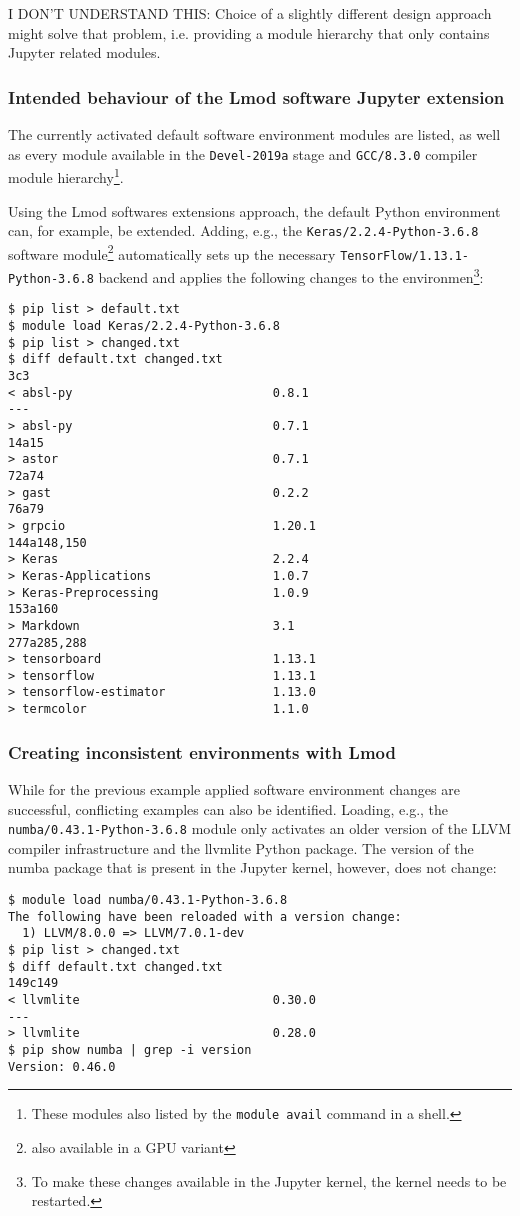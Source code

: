I DON'T UNDERSTAND THIS: Choice of a slightly different design approach might solve that problem, i.e. providing a module hierarchy that only contains Jupyter related modules.

\subsubsection{Intended behaviour of the Lmod software Jupyter extension}

The currently activated default software environment modules are listed, as well as every module available in the \verb|Devel-2019a| stage and \verb|GCC/8.3.0| compiler module hierarchy\cprotect\footnote{These modules also listed by the \verb|module avail| command in a shell.}.

Using the Lmod softwares extensions approach, the default Python environment can, for example, be extended.
Adding, e.g., the \verb|Keras/2.2.4-Python-3.6.8| software module\footnote{also available in a GPU variant} automatically sets up the necessary \verb|TensorFlow/1.13.1-Python-3.6.8| backend and applies the following changes to the environmen\footnote{To make these changes available in the Jupyter kernel, the kernel needs to be restarted.}:
%
\begin{verbatim}
$ pip list > default.txt
$ module load Keras/2.2.4-Python-3.6.8
$ pip list > changed.txt
$ diff default.txt changed.txt
3c3
< absl-py                            0.8.1
---
> absl-py                            0.7.1
14a15
> astor                              0.7.1
72a74
> gast                               0.2.2
76a79
> grpcio                             1.20.1
144a148,150
> Keras                              2.2.4
> Keras-Applications                 1.0.7
> Keras-Preprocessing                1.0.9
153a160
> Markdown                           3.1
277a285,288
> tensorboard                        1.13.1
> tensorflow                         1.13.1
> tensorflow-estimator               1.13.0
> termcolor                          1.1.0
\end{verbatim}

\subsubsection{Creating inconsistent environments with Lmod}

While for the previous example applied software environment changes are successful, conflicting examples can also be identified.
Loading, e.g., the \verb|numba/0.43.1-Python-3.6.8| module only activates an older version of the LLVM compiler infrastructure and the llvmlite Python package. The version of the numba package that is present in the Jupyter kernel, however, does not change:
%
\begin{verbatim}
$ module load numba/0.43.1-Python-3.6.8
The following have been reloaded with a version change:
  1) LLVM/8.0.0 => LLVM/7.0.1-dev
$ pip list > changed.txt
$ diff default.txt changed.txt
149c149
< llvmlite                           0.30.0
---
> llvmlite                           0.28.0
$ pip show numba | grep -i version
Version: 0.46.0
\end{verbatim}

